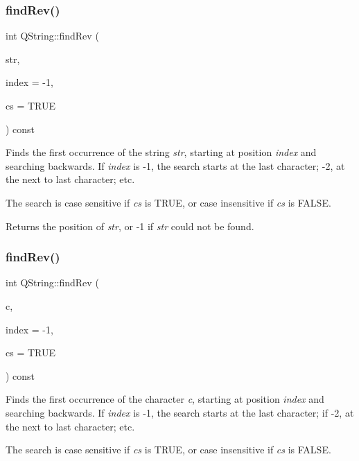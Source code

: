 \subsubsection{\texorpdfstring{findRev()}{findRev()}\hspace{0.1cm}{\footnotesize\ttfamily [4/5]}}
{\footnotesize\ttfamily int Q\+String\+::find\+Rev (\begin{DoxyParamCaption}\item[{const \mbox{\hyperlink{class_q_string}{Q\+String}} \&}]{str,  }\item[{int}]{index = {\ttfamily -\/1},  }\item[{bool}]{cs = {\ttfamily TRUE} }\end{DoxyParamCaption}) const}

Finds the first occurrence of the string {\itshape str}, starting at position {\itshape index} and searching backwards. If {\itshape index} is -\/1, the search starts at the last character; -\/2, at the next to last character; etc.

The search is case sensitive if {\itshape cs} is T\+R\+UE, or case insensitive if {\itshape cs} is F\+A\+L\+SE.

Returns the position of {\itshape str}, or -\/1 if {\itshape str} could not be found. \mbox{\label{class_q_string_a97b5c9712f3f145d52f91d816763ceea}} 
\subsubsection{\texorpdfstring{findRev()}{findRev()}\hspace{0.1cm}{\footnotesize\ttfamily [5/5]}}
{\footnotesize\ttfamily int Q\+String\+::find\+Rev (\begin{DoxyParamCaption}\item[{\mbox{\hyperlink{class_q_char}{Q\+Char}}}]{c,  }\item[{int}]{index = {\ttfamily -\/1},  }\item[{bool}]{cs = {\ttfamily TRUE} }\end{DoxyParamCaption}) const}

Finds the first occurrence of the character {\itshape c}, starting at position {\itshape index} and searching backwards. If {\itshape index} is -\/1, the search starts at the last character; if -\/2, at the next to last character; etc.

The search is case sensitive if {\itshape cs} is T\+R\+UE, or case insensitive if {\itshape cs} is F\+A\+L\+SE.

